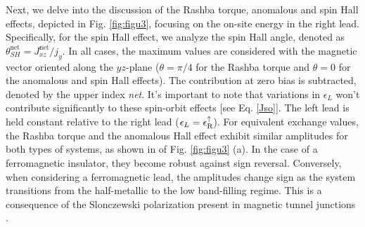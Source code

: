 \documentclass[10pt,pr,twocolumn,showpacs,amssymb,floatfix,superscriptaddress]{revtex4-1}
\newcommand{\upa}{\uparrow}
\newcommand{\eps}{\epsilon}
\begin{document}
Next, we delve into the discussion of the Rashba torque, anomalous and spin Hall effects, depicted in Fig. \ref{fig:figu3}, focusing on the on-site energy in the right lead. Specifically, for the spin Hall effect, we analyze the spin Hall angle, denoted as $\theta^{\text{net}}_{SH} = J^{\text{net}}_{xz}/j_y$. In all cases, the maximum values are considered with the magnetic vector oriented along the $yz$-plane ($\theta = \pi/4$ for the Rashba torque and $\theta = 0$ for the anomalous and spin Hall effects). The contribution at zero bias is subtracted, denoted by the upper index \textit{net}. It's important to note that variations in $\eps_L$ won't contribute significantly to these spin-orbit effects [see Eq. \eqref{Jso}]. The left lead is held constant relative to the right lead ($\eps_L = \eps_{\rm R}^\upa$).
For equivalent exchange values, the Rashba torque and the anomalous Hall effect exhibit similar amplitudes for both types of systems, as shown in of Fig. \ref{fig:figu3} (a). In the case of a ferromagnetic insulator, they become robust against sign reversal. Conversely, when considering a ferromagnetic lead, the amplitudes change sign as the system transitions from the half-metallic to the low band-filling regime. This is a consequence of the Slonczewski polarization present in magnetic tunnel junctions \cite{cop}.
\end{document}
